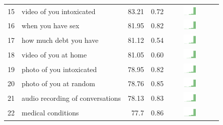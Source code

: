 \begin{table}[t]
\begin{center}
\begin{tabular}{| r | l | r | r | r | r |}
15 & video of you intoxicated & 83.21 & 0.72 & \includegraphics[width = 2cm, height = 0.5cm]{tex-inputs/table-images/tookavideoofyouintoxicatedcombined} \\ 
16 & when you have sex & 81.95 & 0.82 & \includegraphics[width = 2cm, height = 0.5cm]{tex-inputs/table-images/learnedwhenandhowmuchyouhavesexcombined} \\ 
17 & how much debt you have & 81.12  & 0.54 & \includegraphics[width = 2cm, height = 0.5cm]{tex-inputs/table-images/tookavideoofyouintoxicatedcombined} \\ %
18 & video of you at home & 81.05 & 0.60 & \includegraphics[width = 2cm, height = 0.5cm]{tex-inputs/table-images/tookvideosofyou(withaninward-facingcamera)athomecombined} \\ 
19 & photo of you intoxicated & 78.95 & 0.82 &  \includegraphics[width = 2cm, height = 0.5cm]{tex-inputs/table-images/tookaphotoofyouintoxicatedcombined} \\ 
20 & photo of you at random & 78.76 & 0.85 & \includegraphics[width = 2cm, height = 0.5cm]{tex-inputs/table-images/tookphotosofyou(withaninward-facingcamera)atrandomcombined} \\ 
21 & audio recording of conversations & 78.13 & 0.83 & \includegraphics[width = 2cm, height = 0.5cm]{tex-inputs/table-images/recordedyourpassingconversationscombined} \\ 
22 & medical conditions & 77.7 & 0.86 &  \includegraphics[width = 2cm, height = 0.5cm]{tex-inputs/table-images/learnedwhatmedicalconditionsyouhavecombined} \\ 

\end{tabular}
\end{center}
\end{table}
